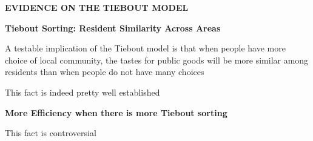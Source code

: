 \documentclass[landscape]{slides}
\begin{document}
%
%
%
%
%
%


%
%
%
%

\begin{slide}
\begin{center}
{\bf EVIDENCE ON THE TIEBOUT MODEL}
\end{center}


{\bf Tiebout Sorting: Resident Similarity Across Areas}

A testable implication of the Tiebout model is that when people have more choice of local community, the tastes for public goods will be more similar among residents than when people do not have many choices

This fact is indeed pretty well established

{\bf More Efficiency when there is more Tiebout sorting}

This fact is controversial

\end{slide}
\end{document}
